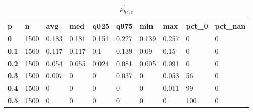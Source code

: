\begin{table}[h]
 \centering 
\footnotesize
\caption{$\rho_{hc,c}^\prime $}
\label{tab:alphahcc}
\begin{tabular}[h]{| l l l l l l l l l l|
    } \hline
\textbf{ p} & \textbf{ n} & \textbf{ avg} & \textbf{ med} & \textbf{ q025} & \textbf{ q975} & \textbf{ min} & \textbf{ max} & \textbf{ pct\_0} & \textbf{ pct\_nan}
           \\
  \textbf{  0} & 1500 & 0.183 & 0.181 & 0.151 & 0.227 & 0.139 & 0.257 &   0 & 0
           \\
  \textbf{0.1} & 1500 & 0.117 & 0.117 &   0.1 & 0.139 &  0.09 &  0.15 &   0 & 0
           \\
  \textbf{0.2} & 1500 & 0.054 & 0.055 & 0.024 & 0.081 & 0.005 & 0.091 &   0 & 0
           \\
  \textbf{0.3} & 1500 & 0.007 &     0 &     0 & 0.037 &     0 & 0.053 &  56 & 0
           \\
  \textbf{0.4} & 1500 &     0 &     0 &     0 &     0 &     0 & 0.011 &  99 & 0
           \\
  \textbf{0.5} & 1500 &     0 &     0 &     0 &     0 &     0 &     0 & 100 & 0
           \\
 \hline \end{tabular}
 \end{table}
